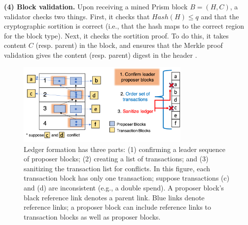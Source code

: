 \noindent \textbf{(4) Block validation.}
Upon  receiving a mined Prism block $B=(H,C)$, a validator checks two things. 
First, it  checks that $Hash( H) \leq q$ and that the cryptographic sortition is correct  (i.e., that the hash  maps to the correct region for the block type).
Next, it checks the sortition proof.  
To do this, it takes content $C$ (resp. parent) in  the block, and ensures that the Merkle proof validation gives the content (resp. parent) digest in the header \cite{merkle}. 


\begin{figure}
   \centering
   \includegraphics[width=0.75\textwidth]{figures/ledger_generation.png}
    \caption{\small Ledger formation has three parts:  
   (1)  confirming a leader  sequence of proposer blocks;
   (2)  creating a list  of transactions;
   and (3) sanitizing the transaction list for conflicts. 
   In this figure, each transaction  block has only one transaction; suppose transactions  (c) and (d) are inconsistent (e.g., a double spend).
   A proposer block's black reference link denotes a parent link. 
    Blue links denote reference links; a proposer block can include reference links to transaction blocks as well as proposer blocks.}
   \label{fig:leader_ledger}

 \end{figure}


